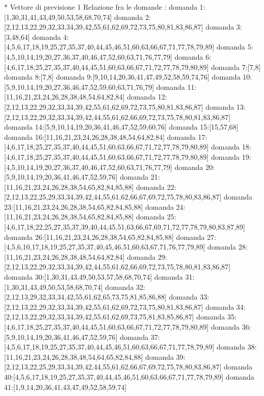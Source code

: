 * Vettore di previsione 1
Relazione fra le domande :
domanda 1:[1,30,31,41,43,49,50,53,58,68,70,74]
domanda 2:[2,12,13,22,29,32,33,34,39,42,55,61,62,69,72,73,75,80,81,83,86,87]
domanda 3:[3,48,64]
domanda 4:[4,5,6,17,18,19,25,27,35,37,40,44,45,46,51,60,63,66,67,71,77,78,79,89]
domanda 5:[4,5,10,14,19,20,27,36,37,40,46,47,52,60,63,71,76,77,79]
domanda 6:[4,6,17,18,25,27,35,37,40,44,45,51,60,63,66,67,71,72,77,78,79,80,89]
domanda 7:[7,8]
domanda 8:[7,8]
domanda 9:[9,10,14,20,36,41,47,49,52,58,59,74,76]
domanda 10:[5,9,10,14,19,20,27,36,46,47,52,59,60,63,71,76,79]
domanda 11:[11,16,21,23,24,26,28,38,48,54,64,82,84]
domanda 12:[2,12,13,22,29,32,33,34,39,42,55,61,62,69,72,73,75,80,81,83,86,87]
domanda 13:[2,12,13,22,29,32,33,34,39,42,44,55,61,62,66,69,72,73,75,78,80,81,83,86,87]
domanda 14:[5,9,10,14,19,20,36,41,46,47,52,59,60,76]
domanda 15:[15,57,68]
domanda 16:[11,16,21,23,24,26,28,38,48,54,64,82,84]
domanda 17:[4,6,17,18,25,27,35,37,40,44,45,51,60,63,66,67,71,72,77,78,79,80,89]
domanda 18:[4,6,17,18,25,27,35,37,40,44,45,51,60,63,66,67,71,72,77,78,79,80,89]
domanda 19:[4,5,10,14,19,20,27,36,37,40,46,47,52,60,63,71,76,77,79]
domanda 20:[5,9,10,14,19,20,36,41,46,47,52,59,76]
domanda 21:[11,16,21,23,24,26,28,38,54,65,82,84,85,88]
domanda 22:[2,12,13,22,25,29,33,34,39,42,44,55,61,62,66,67,69,72,75,78,80,83,86,87]
domanda 23:[11,16,21,23,24,26,28,38,54,65,82,84,85,88]
domanda 24:[11,16,21,23,24,26,28,38,54,65,82,84,85,88]
domanda 25:[4,6,17,18,22,25,27,35,37,39,40,44,45,51,63,66,67,69,71,72,77,78,79,80,83,87,89]
domanda 26:[11,16,21,23,24,26,28,38,54,65,82,84,85,88]
domanda 27:[4,5,6,10,17,18,19,25,27,35,37,40,45,46,51,60,63,67,71,76,77,79,89]
domanda 28:[11,16,21,23,24,26,28,38,48,54,64,82,84]
domanda 29:[2,12,13,22,29,32,33,34,39,42,44,55,61,62,66,69,72,73,75,78,80,81,83,86,87]
domanda 30:[1,30,31,43,49,50,53,57,58,68,70,74]
domanda 31:[1,30,31,43,49,50,53,58,68,70,74]
domanda 32:[2,12,13,29,32,33,34,42,55,61,62,65,73,75,81,85,86,88]
domanda 33:[2,12,13,22,29,32,33,34,39,42,55,61,62,69,72,73,75,80,81,83,86,87]
domanda 34:[2,12,13,22,29,32,33,34,39,42,55,61,62,69,73,75,81,83,85,86,87]
domanda 35:[4,6,17,18,25,27,35,37,40,44,45,51,60,63,66,67,71,72,77,78,79,80,89]
domanda 36:[5,9,10,14,19,20,36,41,46,47,52,59,76]
domanda 37:[4,5,6,17,18,19,25,27,35,37,40,44,45,46,51,60,63,66,67,71,77,78,79,89]
domanda 38:[11,16,21,23,24,26,28,38,48,54,64,65,82,84,88]
domanda 39:[2,12,13,22,25,29,33,34,39,42,44,55,61,62,66,67,69,72,75,78,80,83,86,87]
domanda 40:[4,5,6,17,18,19,25,27,35,37,40,44,45,46,51,60,63,66,67,71,77,78,79,89]
domanda 41:[1,9,14,20,36,41,43,47,49,52,58,59,74]
